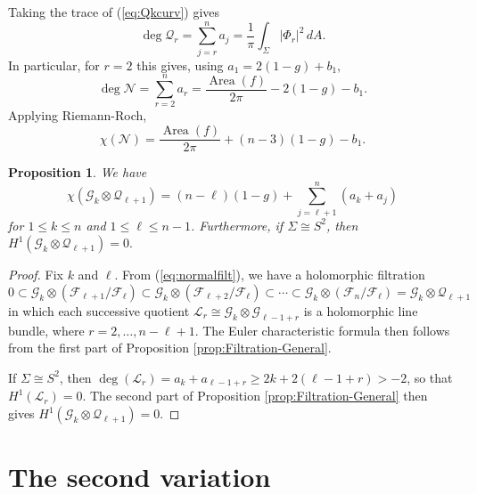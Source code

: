 \documentclass[11pt]{article}
\newtheorem{prop}[theorem]{Proposition}
\theoremstyle{definition}
\numberwithin{equation}{section}
\begin{document}
Taking the trace of (\ref{eq:Qkcurv}) gives
\begin{equation*}
	\deg \mathcal{Q}_r = \sum_{j=r}^n a_j = \frac{1}{\pi} \int_{\Sigma} \lvert \Phi_r \rvert^2 \, dA.
\end{equation*}
In particular, for $r=2$ this gives, using $a_1 = 2(1-g)+b_1,$
\begin{equation*}
	\deg \mathcal{N} = \sum_{r=2}^{n} a_r = \frac{\operatorname{Area}(f)}{2\pi} - 2(1-g) - b_1.
\end{equation*}
Applying Riemann-Roch,
\begin{equation}\label{eq:EuCharN}
	\chi(\mathcal{N}) = \frac{\operatorname{Area}(f)}{2\pi} + (n-3)(1-g) - b_1.
\end{equation}

\begin{prop}\label{prop:firstcohomvanish}  We have
	\begin{equation}\label{eq:EuCharGQ}
	    \chi(\mathcal{G}_k \otimes \mathcal{Q}_{\ell+1}) = (n-\ell)(1-g) + \sum_{j = \ell+1}^{n} (a_k + a_{j})
	\end{equation}
	for $1 \leq k \leq n$ and $1 \leq \ell \leq n-1$. Furthermore, if $\Sigma \cong S^2$, then  $H^1(\mathcal{G}_k \otimes \mathcal{Q}_{\ell+1}) = 0.$
\end{prop}

\begin{proof} Fix $k$ and $\ell$. From  (\ref{eq:normalfilt}), we have a holomorphic filtration
	$$0 \subset \mathcal{G}_k \otimes (\mathcal{F}_{\ell+1}/\mathcal{F}_{\ell}) \subset \mathcal{G}_k \otimes (\mathcal{F}_{\ell+2}/\mathcal{F}_{\ell}) \subset \cdots \subset \mathcal{G}_k \otimes (\mathcal{F}_n/\mathcal{F}_\ell) = \mathcal{G}_k \otimes \mathcal{Q}_{\ell+1}$$
	in which each successive quotient $\mathcal{L}_r \cong \mathcal{G}_k \otimes \mathcal{G}_{\ell-1+r}$ is a holomorphic line bundle, where $r = 2, \ldots, n-\ell+1$. The Euler characteristic formula then follows from the first part of Proposition \ref{prop:Filtration-General}. 
    
    If $\Sigma \cong S^2$, then $\deg(\mathcal{L}_r) = a_k + a_{\ell-1+r} \geq 2k + 2(\ell-1+r) > -2$, so that $H^1(\mathcal{L}_r) = 0$. The second part of Proposition \ref{prop:Filtration-General} then gives $H^1(\mathcal{G}_k \otimes \mathcal{Q}_{\ell+1}) = 0.$
\end{proof}

\section{The second variation}\label{sect:secondvar}
\end{document}
